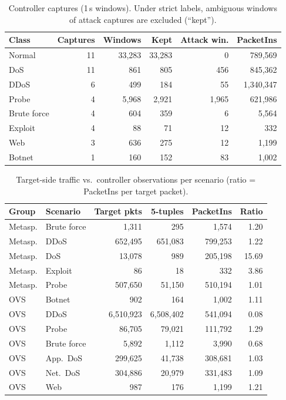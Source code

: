 \begin{table}[t]
\caption{Controller captures (1\,s windows). Under strict labels, ambiguous windows of attack captures are excluded (``kept'').}
\label{tab:inventory}
\centering\footnotesize\setlength{\tabcolsep}{3pt}
\begin{tabular}{lrrrrr}
\toprule
Class & Captures & Windows & Kept & Attack win. & PacketIns \\
\midrule
Normal & 11 & 33,283 & 33,283 & 0 & 789,569 \\
DoS & 11 & 861 & 805 & 456 & 845,362 \\
DDoS & 6 & 499 & 184 & 55 & 1,340,347 \\
Probe & 4 & 5,968 & 2,921 & 1,965 & 621,986 \\
Brute force & 4 & 604 & 359 & 6 & 5,564 \\
Exploit & 4 & 88 & 71 & 12 & 332 \\
Web & 3 & 636 & 275 & 12 & 1,199 \\
Botnet & 1 & 160 & 152 & 83 & 1,002 \\
\bottomrule
\end{tabular}
\end{table}

\begin{table}[t]
\caption{Target-side traffic vs.\ controller observations per scenario (ratio = PacketIns per target packet).}
\label{tab:gap}
\centering\footnotesize
\begin{tabular}{llrrrr}
\toprule
Group & Scenario & Target pkts & 5-tuples & PacketIns & Ratio \\
\midrule
Metasp. & Brute force & 1,311 & 295 & 1,574 & 1.20 \\
Metasp. & DDoS & 652,495 & 651,083 & 799,253 & 1.22 \\
Metasp. & DoS & 13,078 & 989 & 205,198 & 15.69 \\
Metasp. & Exploit & 86 & 18 & 332 & 3.86 \\
Metasp. & Probe & 507,650 & 51,150 & 510,194 & 1.01 \\
OVS & Botnet & 902 & 164 & 1,002 & 1.11 \\
OVS & DDoS & 6,510,923 & 6,508,402 & 541,094 & 0.08 \\
OVS & Probe & 86,705 & 79,021 & 111,792 & 1.29 \\
OVS & Brute force & 5,892 & 1,112 & 3,990 & 0.68 \\
OVS & App.\ DoS & 299,625 & 41,738 & 308,681 & 1.03 \\
OVS & Net.\ DoS & 304,886 & 20,979 & 331,483 & 1.09 \\
OVS & Web & 987 & 176 & 1,199 & 1.21 \\
\bottomrule
\end{tabular}
\end{table}

